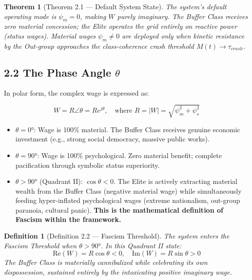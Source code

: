 \documentclass[12pt]{book}
\numberwithin{equation}{chapter}
\newtheorem{theorem}{Theorem}[chapter]
\newtheorem{definition}{Definition}[chapter]
\begin{document}
\begin{theorem}[Theorem 2.1 — Default System State]
The system's default operating mode is $\psi_m = 0$, making $W$ purely imaginary. The Buffer Class receives zero material concession; the Elite operates the grid entirely on reactive power (status wages). Material wages $\psi_m \neq 0$ are deployed only when kinetic resistance by the Out-group approaches the class-coherence crash threshold $M(t) \to \tau_{crash}$.
  \end{theorem}

\subsection{2.2 The Phase Angle $\theta$}

    In polar form, the complex wage is expressed as:
  

\begin{equation}
W = R \angle\theta = R e^{j\theta}, \quad \text{where } R = |W| = \sqrt{\psi_m^2 + \psi_s^2}
\end{equation}

\begin{itemize}

\item $\theta = 0°$: Wage is 100\% material. The Buffer Class receives genuine economic investment (e.g., strong social democracy, massive public works).

\item $\theta = 90°$: Wage is 100\% psychological. Zero material benefit; complete pacification through symbolic status superiority.

\item $\theta > 90°$ (Quadrant II): $\cos\theta < 0$. The Elite is actively extracting material wealth from the Buffer Class (negative material wage) while simultaneously feeding hyper-inflated psychological wages (extreme nationalism, out-group paranoia, cultural panic). \textbf{This is the mathematical definition of Fascism within the framework.}

\end{itemize}

\begin{definition}[Definition 2.2 — Fascism Threshold]
The system enters the Fascism Threshold when $\theta > 90°$. In this Quadrant II state:
      \[ \text{Re}(W) = R\cos\theta < 0, \quad \text{Im}(W) = R\sin\theta > 0 \]
    The Buffer Class is materially cannibalized while celebrating its own dispossession, sustained entirely by the intoxicating positive imaginary wage.
  \end{definition}
\end{document}
